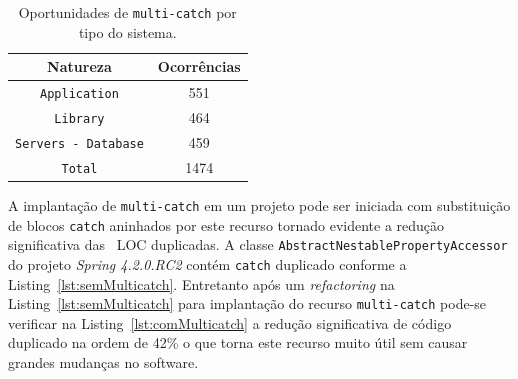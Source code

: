 \begin{table}[h]
	\centering
	\caption{Oportunidades de \texttt{multi-catch} por tipo do sistema.}
	\begin{tabular}{cc}
		\hline
		Natureza & Ocorrências \\ 
		\hline \hline
		\texttt{Application} & 551 \\ 
		\texttt{Library} &  464 \\ 
		\texttt{Servers - Database} &  459 \\ \hline
		\texttt{Total} &  1474 \\ \hline
	\end{tabular}
	\label{tab:oportunidadesMulticatch} %
\end{table}
		
A implantação de \texttt{multi-catch} em um projeto pode ser iniciada com substituição de blocos \texttt{catch} aninhados por este recurso tornado evidente a redução significativa das ~\acs{LOC} duplicadas. A classe \texttt{AbstractNestablePropertyAccessor} do projeto  \textit{Spring 4.2.0.RC2} contém \texttt{catch} duplicado conforme a Listing~\ref{lst:semMulticatch}. Entretanto após um \textit{refactoring} na Listing~\ref{lst:semMulticatch} para implantação do recurso \texttt{multi-catch} pode-se verificar na Listing~\ref{lst:comMulticatch} a redução significativa de código duplicado na ordem de \num{42}\% o que torna este recurso muito útil sem causar grandes mudanças no software.


